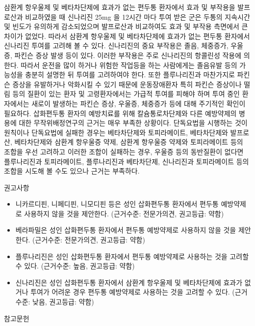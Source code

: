 \documentclass[]{book}
\begin{document}
삼환계 항우울제 및 베타차단제에 효과가 없는 편두통 환자에서 효과 및 부작용을 발프로산과 비교하였을 때 신나리진 25mg 을 12시간 마다 투여 받은 군은 두통의 지속시간 및 빈도가 유의하게 감소되었으며 발프로산과 비교하여도 효과 및 부작용 측면에서 큰 차이가 없었다. 따라서 삼환계 항우울제 및 베타차단제에 효과가 없는 편두통 환자에서 신나리진 투여를 고려해 볼 수 있다. 신나리진의 중요 부작용은 졸음, 체중증가, 우울증, 파킨슨 증상 발생 등이 있다. 이러한 부작용은 주로 신나리진의 항콜린성 작용에 의한다. 따라서 운전을 많이 하거나 위험한 작업등을 하는 사람에게는 졸음유발 등의 가능성을 충분히 설명한 뒤 투여를 고려하여야 한다. 또한 플루나리진과 마찬가지로 파킨슨 증상을 유발하거나 악화시킬 수 있기 때문에 운동장애환자 특히 파킨슨 증상이나 떨림 등의 질환이 있는 환자 및 고령환자에서는 가급적 투여를 피해야 하며 투여 중인 환자에서는 새로이 발생하는 파킨슨 증상, 우울증, 체중증가 등에 대해 주기적인 확인이 필요하다.
삽화편두통 환자의 예방치료를 위해 칼슘통로차단제와 다른 예방약제의 병용에 대한 무작위배정연구의 근거는 매우 부족한 상황이다. 단독요법을 시행하는 것이 원칙이나 단독요법에 실패한 경우는 베타차단제와 토피라메이트, 베타차단제와 발프로산, 베타차단제와 삼환계 항우울증 약제, 삼환계 항우울증 약제와 토피라메이트 등의 조합을 우선 고려하고 이러한 조합이 실패하는 경우, 우울증 등의 동반질환이 없다면 플루나리진과 토피라메이트, 플루나리진과 베타차단제, 신나리진과 토피라메이트 등의 조합을 시도해 볼 수도 있으나 근거는 부족하다.

권고사항

\begin{itemize}
\item
  니카르디핀, 니페디핀, 니모디핀 등은 성인 삽화편두통 환자에서 편두통 예방약제로 사용하지 않을 것을 제안한다. (근거수준: 전문가의견, 권고등급: 약함)
\item
  베라파밀은 성인 삽화편두통 환자에서 편두통 예방약제로 사용하지 않을 것을 제안한다. (근거수준: 전문가의견, 권고등급: 약함)
\item
  플루나리진은 성인 삽화편두통 환자에서 편두통 예방약제로 사용하는 것을 고려할 수 있다. (근거수준: 높음, 권고등급: 약함)
\item
  신나리진은 성인 삽화편두통 환자에서 삼환계 항우울제 및 베타차단제에 효과가 없거나 투여가 어려운 경우 편두통 예방약제로 사용하는 것을 고려할 수 있다. (근거수준: 낮음, 권고등급: 약함)
\end{itemize}

참고문헌
\end{document}
